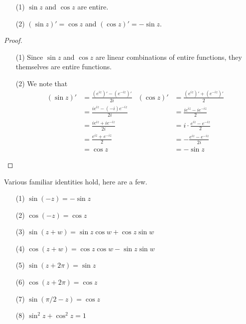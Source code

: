 \begin{proposition}\hfill
\begin{itemize}
\item[(1)] $\sin z$ and $\cos z$ are entire.
\item[(2)] $(\sin z)' = \cos z$ and $(\cos z)' = -\sin z$.
\end{itemize}
\end{proposition}
\begin{proof}\hfill
\begin{itemize}
\item[(1)] Since $\sin z$ and $\cos z$ are linear combinations of entire functions, they themselves are entire functions.
\item[(2)] We note that
\begin{align*}
(\sin z)' &= \frac{(e^{iz})' - (e^{-iz})'}{2i} & (\cos z)' &= \frac{(e^{iz})' + (e^{-iz})'}{2}\\[0.5em]
 &= \frac{ie^{iz} -(-i) e^{-iz}}{2i} &  &= \frac{ie^{iz} - ie^{-iz}}{2}\\[0.5em]
 &= \frac{ie^{iz} + ie^{-iz}}{2i} &  &= i\cdot\frac{e^{iz} - e^{-iz}}{2}\\[0.5em]
 &= \frac{e^{iz} + e^{-iz}}{2} &  &= -\frac{e^{iz} - e^{-iz}}{2i}\\[0.5em]
 &= \cos z &  &= -\sin z
\end{align*}
\end{itemize}
\vspace*{-\baselineskip}
\end{proof}

\vspace*{1em}

\begin{discussion}\label{trigid}
Various familiar identities hold, here are a few.
\begin{multicols}{2}
\begin{itemize}
\item[(1)] $\sin (-z) = -\sin z$
\item[(2)] $\cos(-z) = \cos z$
\item[(3)] $\sin (z+w) = \sin z \cos w + \cos z\sin w$
\item[(4)] $\cos (z+w) = \cos z \cos w - \sin z\sin w$
\item[(5)] $\sin (z+2\pi) = \sin z$
\item[(6)] $\cos (z+ 2\pi) = \cos z$
\item[(7)] $\sin (\pi/2 - z) = \cos z$
\item[(8)] $\sin^2z + \cos^2z = 1$
\end{itemize}
\end{multicols}
\end{discussion}

